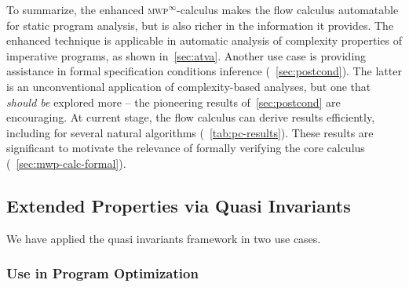 To summarize, the enhanced \textsc{mwp}\(^\infty\)-calculus makes the flow calculus automatable for static program analysis,
but is also richer in the information it provides.
The enhanced technique is applicable in automatic analysis of complexity properties of imperative programs, as shown in~\autoref{sec:atva}.
Another use case is providing assistance in formal specification conditions inference (\cf~\autoref{sec:postcond}).
The latter is an unconventional application of complexity-based analyses, but one that \emph{should be} explored more --
the pioneering results of~\autoref{sec:postcond} are encouraging.
At current stage, the flow calculus can derive results efficiently, including for several natural algorithms (\cf~\autoref{tab:pc-results}).
These results are significant to motivate the relevance of formally verifying the core calculus (\cf~\autoref{sec:mwp-calc-formal}).


\subsection{Extended Properties via Quasi Invariants}
\label{subsec:res-qi}

We have applied the quasi invariants framework in two use cases.

\subsubsection{Use in Program Optimization}
\label{subsubsec:qi-opt}

